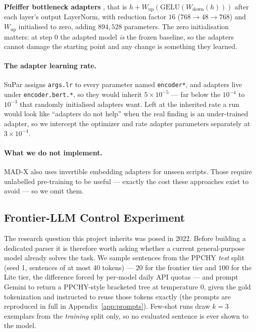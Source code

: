 \documentclass[11pt]{article}
\begin{document}
\textbf{Pfeiffer bottleneck adapters} \citep{pfeiffer-etal-2020-mad}, that is
$h + W_{\text{up}}(\mathrm{GELU}(W_{\text{down}}(h)))$ after each layer's output
LayerNorm, with reduction factor $16$ ($768 \rightarrow 48 \rightarrow 768$) and
$W_{\text{up}}$ initialised to zero, adding $894{,}528$ parameters. The zero
initialisation matters: at step $0$ the adapted model \emph{is} the frozen
baseline, so the adapters cannot damage the starting point and any change is
something they learned.

\paragraph{The adapter learning rate.} SuPar assigns \texttt{args.lr} to every
parameter named \texttt{encoder*}, and adapters live under
\texttt{encoder.bert.*}, so they would inherit $5\times10^{-5}$ --- far below the
$10^{-4}$ to $10^{-3}$ that randomly initialised adapters want. Left at the
inherited rate a run would look like ``adapters do not help'' when the real
finding is an under-trained adapter, so we intercept the optimizer and rate
adapter parameters separately at $3\times10^{-4}$.

\paragraph{What we do not implement.} MAD-X also uses invertible embedding
adapters for unseen scripts. Those require unlabelled pre-training to be useful
--- exactly the cost these approaches exist to avoid --- so we omit them.

\subsection{Frontier-LLM Control Experiment}
The research question this project inherits was posed in 2022. Before building a
dedicated parser it is therefore worth asking whether a current general-purpose
model already solves the task. We sample sentences from the PPCHY \emph{test}
split (seed 1, sentences of at most 40 tokens) --- $20$ for the frontier tier and
$100$ for the Lite tier, the difference forced by per-model daily API quotas ---
and prompt Gemini
\citep{geminiteam-2023-gemini} to return a PPCHY-style bracketed tree at
temperature 0, given the gold tokenization and instructed to reuse those tokens
exactly (the prompts are reproduced in full in Appendix~\ref{app:prompts}).
Few-shot runs draw $k{=}3$ exemplars from the \emph{training} split
only, so no evaluated sentence is ever shown to the model.
\end{document}
